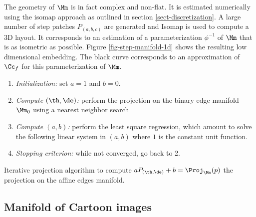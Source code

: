 The geometry of $\Mm$ is in fact complex and non-flat. It is estimated numerically using the isomap approach as outlined in section \ref{sect-discretization}. A large number of step patches $P_{(a,b,c)}$ are generated and Isomap is used to compute a 3D layout. It corresponds to an estimation of a parameterization $\phi^{-1}$ of $\Mm$ that is as isometric as possible. Figure \ref{fig-step-manifold-1d} shows the resulting low dimensional embedding. The black curve corresponds to an approximation of $\Cc_f$ for this parameterization of $\Mm$.





\begin{listing}
\begin{enumerate}
	\item \textit{Initialization:} set $a=1$ and $b=0$.
	\item \textit{Compute $(\th,\de)$:} perform the projection on the binary edge manifold $\Mm_0$ using a nearest neighbor search
	\item \textit{Compute $(a,b)$:} perform the least square regression, which amount to solve the following linear system in $(a,b)$
		where $1$ is the constant unit function.
	\item \textit{Stopping criterion:} while not converged, go back to 2.
\end{enumerate}%
    \caption{Iterative projection algorithm to compute $a P_{(\th,\de)} + b = \Proj_{\Mm}(p)$ the projection on the affine edges manifold. \label{listing-proj-affine-edges}}
\end{listing}




\subsection{Manifold of Cartoon images}

